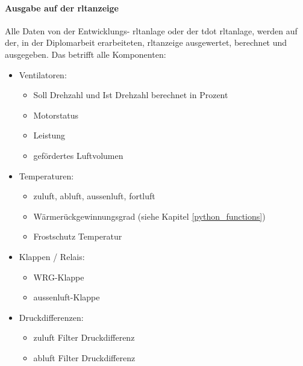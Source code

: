 \paragraph{Ausgabe auf der \ac{rltanzeige}}
Alle Daten von der Entwicklungs- \ac{rltanlage} oder der \gls{tdot} \ac{rltanlage}, werden auf der, in der Diplomarbeit erarbeiteten, \ac{rltanzeige} ausgewertet, berechnet und ausgegeben. 
Das betrifft alle Komponenten:
\begin{itemize}

	\item Ventilatoren: 
	\begin{itemize}
		\item Soll Drehzahl und Ist Drehzahl berechnet in Prozent
		\item Motorstatus
		\item Leistung 
		\item gefördertes Luftvolumen
	\end{itemize}

	\item Temperaturen:
	\begin{itemize}
		\item \gls{zuluft}, \gls{abluft}, \gls{aussenluft}, \gls{fortluft} 
		\item Wärmerückgewinnungsgrad (siehe Kapitel \ref{python_functions})
		\item Frostschutz Temperatur 
	\end{itemize}

	\item Klappen / Relais:
	\begin{itemize}
		\item WRG-Klappe
		\item \gls{aussenluft}-Klappe 
	\end{itemize}
	
	\item Druckdifferenzen:
	\begin{itemize}
		\item \gls{zuluft} Filter Druckdifferenz
		\item \gls{abluft} Filter Druckdifferenz
	\end{itemize}
\end{itemize}

\newpage
